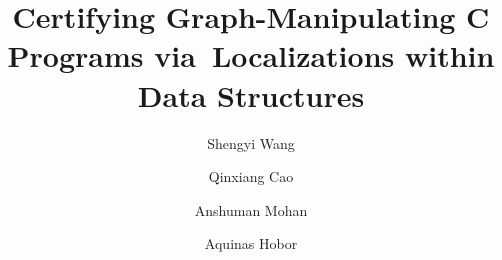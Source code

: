 \documentclass[acmsmall]{acmart}\settopmatter{}
\begin{document}
\title[Certifying Graph-Manipulating Programs]
{Certifying Graph-Manipulating C Programs via~Localizations within Data Structures}



\author{Shengyi Wang}

\author{Qinxiang Cao}

\author{Anshuman Mohan}

\author{Aquinas Hobor}
\end{document}
